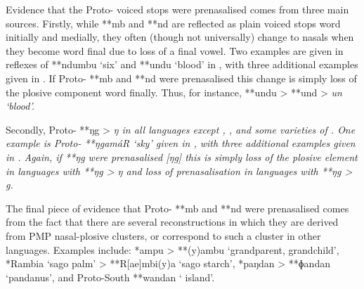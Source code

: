 Evidence that the Proto- voiced stops were prenasalised comes
from three main sources.
Firstly, while **mb and **nd are reflected as plain voiced stops
word initially and medially, they often (though not universally) change to nasals
when they become word final due to loss of a final vowel.
Two examples are given in reflexes of **ndumbu ‘six’
and **undu ‘blood’ in ,
with three additional examples given in .
If Proto-
**mb and **nd were prenasalised this change is simply loss of the
plosive component word finally.
Thus, for instance, **undu > **und >  \it{un} ‘blood’.

Secondly, Proto- **ŋg > \it{ŋ} in all languages except ,
, and some varieties of .
One example is Proto- **ŋgamáR ‘sky’ given in ,
with three additional examples given in .
Again, if **ŋg were prenasalised [ŋg] this is simply loss of the plosive
element in languages with **ŋg > \it{ŋ}
and loss of prenasalisation in languages with **ŋg > \it{g}.

The final piece of evidence that Proto- **mb
and **nd were prenasalised comes from the fact that there are
several reconstructions in which they are derived from PMP nasal-plosive
clusters, or correspond to such a cluster in other languages.
Examples include: *ampu > **(y)ambu ‘grandparent,
grandchild’, *Rambia ‘sago palm’ > **R[ae]mbi(y)a ‘sago starch’,
*paŋdan > **ɸandan ‘pandanus’,
and Proto-South  **wandan ‘ island’.

